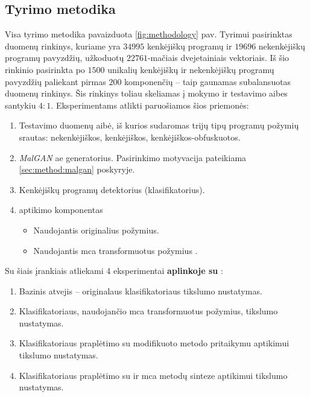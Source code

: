
\subsection{Tyrimo metodika}

Visa tyrimo metodika pavaizduota \ref{fig:methodology} pav. Tyrimui pasirinktas \SLEIPNIR \cite{al-dujailiAdversarialDeepLearning2018} duomenų rinkinys, kuriame yra $34995$ kenkėjiškų programų ir $19696$ nekenkėjiškų programų pavyzdžių, užkoduotų $22761$-mačiais dvejetainiais vektoriais. Iš šio rinkinio pasirinkta po $1500$ unikalių kenkėjiškų ir nekenkėjiškų programų pavyzdžių paliekant pirmas $200$ komponenčių -- taip gaunamas subalansuotas duomenų rinkinys. Šis rinkinys toliau skeliamas į mokymo ir testavimo aibes santykiu $4:1$.
Eksperimentams atlikti paruošiamos šios priemonės:
\begin{enumerate}
    \item Testavimo duomenų aibė, iš kurios sudaromas trijų tipų programų požymių srautas: nekenkėjiškos, kenkėjiškos, kenkėjiškos-obfuskuotos.
    \item \textit{MalGAN} \cite{huGeneratingAdversarialMalware2017} \gls{ae} generatorius. Pasirinkimo motyvacija pateikiama \ref{sec:method:malgan} poskyryje.
    \item Kenkėjiškų programų detektorius (klasifikatorius).
    \item {} aptikimo komponentas
    \begin{itemize}
        \item Naudojantis originalius požymius.
        \item Naudojantis \gls{mca} transformuotus požymius .
    \end{itemize}
\end{enumerate}

\noindent
Su šiais įrankiais atliekami 4 eksperimentai \textbf{aplinkoje su }:
    \begin{enumerate}
        \item Bazinis atvejis -- originalaus klasifikatoriaus tikslumo nustatymas.
        \item Klasifikatoriaus, naudojančio \gls{mca} transformuotus požymius, tikslumo nustatymas.
        \item Klasifikatoriaus praplėtimo su modifikuoto \LIME metodo pritaikymu  aptikimui tikslumo nustatymas.
        \item Klasifikatoriaus praplėtimo su \LIME ir \gls{mca} metodų sinteze  aptikimui tikslumo nustatymas.
    \end{enumerate}

